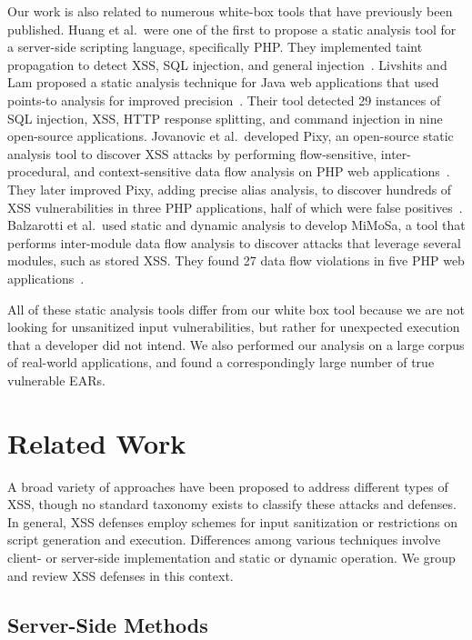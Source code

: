 Our work is also related to numerous white-box tools that have previously
been published. Huang et al.\ were one of the first to propose a static
analysis tool for a server-side scripting language, specifically PHP. They
implemented taint propagation to detect XSS, SQL injection, and general
injection~\cite{huang04:securing}. Livshits and Lam proposed a static
analysis technique for Java web applications that used points-to analysis
for improved precision~\cite{livshits05:java-static}. Their tool detected
29 instances of SQL injection, XSS, HTTP response splitting, and command
injection in nine open-source applications. Jovanovic et al.\ developed
Pixy, an open-source static analysis tool to discover XSS attacks by
performing flow-sensitive, inter-procedural, and context-sensitive data flow
analysis on PHP web applications~\cite{jovanovic06:pixy-improved}. They
later improved Pixy, adding precise alias analysis, to discover hundreds of
XSS vulnerabilities in three PHP applications, half of which were false
positives~\cite{jovanovic06:pixy-short}. Balzarotti et al.\ used static and
dynamic analysis to develop MiMoSa, a tool that performs inter-module data
flow analysis to discover attacks that leverage several modules, such as
stored XSS. They found 27 data flow violations in five PHP web
applications~\cite{balzarotti07:mimosa}.

All of these static analysis tools differ from our white box tool
because we are not looking for unsanitized input
vulnerabilities, but rather for unexpected execution that a developer
did not intend. We also performed our analysis on a large corpus of
real-world applications, and found a correspondingly large number of true
vulnerable EARs.

\section{\dedacota{} Related Work}

A broad variety of approaches have been proposed to address different types of XSS, though no standard taxonomy exists to classify these attacks and defenses. In general, XSS defenses employ schemes for input sanitization or restrictions on script generation and execution.  Differences among various techniques involve client- or server-side implementation and static or dynamic operation. We group and review XSS defenses in this context.

\subsection{Server-Side Methods}

